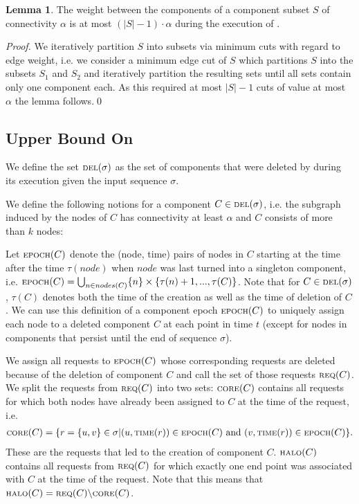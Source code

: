 \documentclass[a4paper,xcolor=dvipsnames, tikz, 12pt]{article}
\newcommand{\crep}{\text{C{\scriptsize REP}}}
\newcommand{\del}{\text{\scriptsize DEL}}
\newcommand{\core}{\text{\scriptsize CORE}}
\newcommand{\halo}{\text{\scriptsize HALO}}
\newcommand{\req}{\text{\scriptsize REQ}}
\newcommand{\epoch}{\text{\scriptsize EPOCH}}
\newcommand{\reqTime}{\text{\scriptsize TIME}}
\theoremstyle{definition}
\newtheorem{lemma}[defi]{Lemma}
\begin{document}
\begin{lemma}
	\label{cut_lemma_upper}
	The weight between the components of a component subset $S$ of connectivity $\alpha$ is at most $(|S|-1)\cdot\alpha$ during the execution of \crep{}.
\end{lemma}
\textit{Proof.} We iteratively partition $S$ into subsets via minimum cuts with regard to edge weight, i.e. we consider a minimum edge cut of $S$ which partitions $S$ into the subsets $S_1$ and $S_2$ and iteratively partition the resulting sets until all sets contain only one component each. As this required at most $|S|-1$ cuts of value at most $\alpha$ the lemma follows.\qed

\subsection{Upper Bound On \crep{}}

We define the set $\del(\sigma)$ as the set of components that were deleted by \crep{} during its execution given the input sequence $\sigma$.

We define the following notions for a component $C\in\del{}(\sigma)$, i.e. the subgraph induced by the nodes of $C$ has connectivity at least $\alpha$ and $C$ consists of more than $k$ nodes:

Let $\epoch{}(C)$ denote the (node, time) pairs of nodes in $C$ starting at the time after the time $\tau(node)$ when $node$ was last turned into a singleton component, i.e. $\epoch{}(C)=\bigcup_{n\in nodes(C)}\{n\}\times\{\tau(n)+1,...,\tau(C)\}$. Note that for $C\in\del(\sigma)$, $\tau(C)$ denotes both the time of the creation as well as the time of deletion of $C$. We can use this definition of a component epoch $\epoch(C)$ to uniquely assign each node to a deleted component $C$ at each point in time $t$ (except for nodes in components that persist until the end of sequence $\sigma$).

We assign all requests to $\epoch(C)$ whose corresponding requests are deleted because of the deletion of component $C$ and call the set of those requests $\req(C)$.
We split the requests from $\req{}(C)$ into two sets: $\core(C)$ contains all requests for which both nodes have already been assigned to $C$ at the time of the request, i.e. 
\begin{align*}
\core(C)=\{r=\{u,v\}\in\sigma| (u,\reqTime(r))\in \epoch(C)\text{ and } (v, \reqTime(r))\in \epoch(C)\}.
\end{align*}
These are the requests that led to the creation of component $C$. 
$\halo(C)$ contains all requests from $\req(C)$ for which exactly one end point was associated with $C$ at the time of the request. Note that this means that $\halo(C)=\req(C)\backslash \core(C)$.
\end{document}
